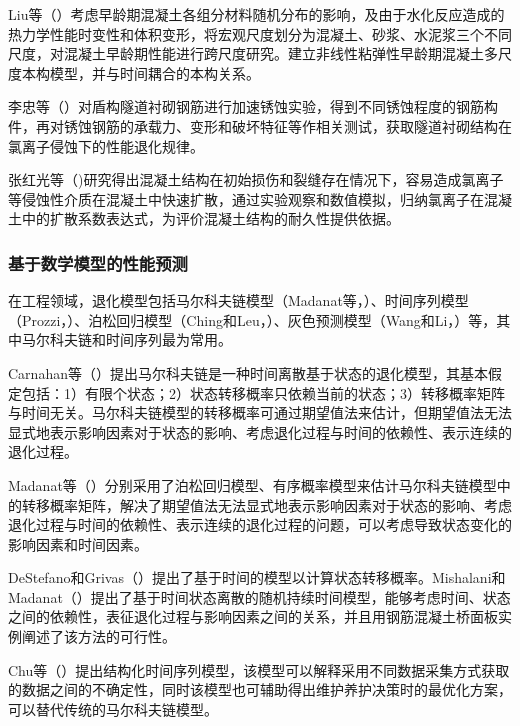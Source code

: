 Liu等（\citeyear{Liu2014A}）考虑早龄期混凝土各组分材料随机分布的影响，及由于水化反应造成的热力学性能时变性和体积变形，将宏观尺度划分为混凝土、砂浆、水泥浆三个不同尺度，对混凝土早龄期性能进行跨尺度研究。建立非线性粘弹性早龄期混凝土多尺度本构模型，并与时间耦合的本构关系。

李忠等（\citeyear{李忠2009氯离子侵蚀盾构隧道衬砌结构性能退化试验}）对盾构隧道衬砌钢筋进行加速锈蚀实验，得到不同锈蚀程度的钢筋构件，再对锈蚀钢筋的承载力、变形和破坏特征等作相关测试，获取隧道衬砌结构在氯离子侵蚀下的性能退化规律。

张红光等（\citeyear{张红光2014开裂混凝土内氯离子扩散机理及数值模拟研究})研究得出混凝土结构在初始损伤和裂缝存在情况下，容易造成氯离子等侵蚀性介质在混凝土中快速扩散，通过实验观察和数值模拟，归纳氯离子在混凝土中的扩散系数表达式，为评价混凝土结构的耐久性提供依据。

\subsubsection{基于数学模型的性能预测}

在工程领域，退化模型包括马尔科夫链模型（Madanat等，\citeyear{Madanat1997Probabilistic}）、时间序列模型（Prozzi，\citeyear{prozzi2001modeling}）、泊松回归模型（Ching和Leu，\citeyear{ching2009bayesian}）、灰色预测模型（Wang和Li，\citeyear{wang2011pavement}）等，其中马尔科夫链和时间序列最为常用。

Carnahan等（\citeyear{camahan1987optimal}）提出马尔科夫链是一种时间离散基于状态的退化模型，其基本假定包括：1）有限个状态；2）状态转移概率只依赖当前的状态；3）转移概率矩阵与时间无关。马尔科夫链模型的转移概率可通过期望值法来估计，但期望值法无法显式地表示影响因素对于状态的影响、考虑退化过程与时间的依赖性、表示连续的退化过程。

Madanat等（\citeyear{Madanat1997Probabilistic}）分别采用了泊松回归模型、有序概率模型来估计马尔科夫链模型中的转移概率矩阵，解决了期望值法无法显式地表示影响因素对于状态的影响、考虑退化过程与时间的依赖性、表示连续的退化过程的问题，可以考虑导致状态变化的影响因素和时间因素。

DeStefano和Grivas（\citeyear{destefano1998method}）提出了基于时间的模型以计算状态转移概率。Mishalani和Madanat（\citeyear{mishalani2002computation}）提出了基于时间状态离散的随机持续时间模型，能够考虑时间、状态之间的依赖性，表征退化过程与影响因素之间的关系，并且用钢筋混凝土桥面板实例阐述了该方法的可行性。

Chu等（\citeyear{chu2005estimation}）提出结构化时间序列模型，该模型可以解释采用不同数据采集方式获取的数据之间的不确定性，同时该模型也可辅助得出维护养护决策时的最优化方案，可以替代传统的马尔科夫链模型。

